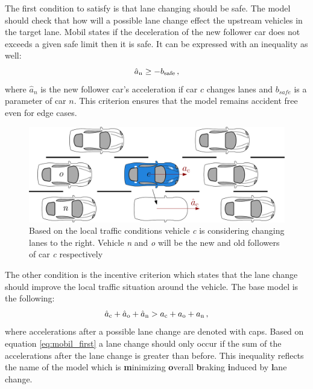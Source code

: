 \documentclass[a4paper,12pt,twoside]{report} %
\begin{document}
			The first condition to satisfy is that lane changing should be safe. The model should check that how will a possible lane change effect the upstream vehicles in the target lane. Mobil states if the deceleration of the new follower car does not exceeds a given safe limit then it is safe. It can be expressed with an inequality as well:
			\begin{equation}
				\hat{a}_{\rm n}\geq -b_{\rm safe}\,,
			\end{equation}
			where $\hat{a}_n$ is the new follower car's acceleration if car $c$ changes lanes and $b_{safe}$ is a parameter of car $n$. This criterion ensures that the model remains accident free even for edge cases.
			\begin{figure}[ht]
				\centering
				\includegraphics[width=.95\textwidth]{mobil.eps}
				\caption{Based on the local traffic conditions vehicle \textit{c} is considering changing lanes  to the right. Vehicle \textit{n} and \textit{o} will be the new and old followers of car \textit{c} respectively}
				\label{fig:mobil}
			\end{figure}
			The other condition is the incentive criterion which states that the lane change should improve the local traffic situation around the vehicle.  The base model is the following:
			\begin{equation}
				\hat{a}_{\rm c} + \hat{a}_{\rm o} + \hat{a}_{\rm n} > a_{\rm c} + a_{\rm o} + a_{\rm n}\,,
				\label{eq:mobil_first}
			\end{equation}
			where accelerations after a possible lane change are denoted with caps.
			Based on equation \ref{eq:mobil_first} a lane change should only occur if the sum of the accelerations after the lane change is greater than before. This inequality reflects the name of the model which is \textbf{m}inimizing \textbf{o}verall \textbf{b}raking \textbf{i}nduced by \textbf{l}ane change.
\end{document}
